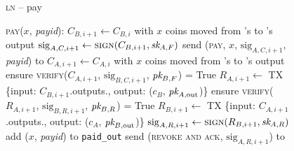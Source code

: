 \begin{figure}[H]
  \begin{processbox}{\textsc{ln} -- pay}
    \begin{algorithmic}[1]
      \State \textsc{pay}($x$, \textit{payid}): 
      \Indent
        \State $C_{B, i+1} \gets C_{B, i}$ with $x$ coins moved from \alice's to
        \bob's output
        \State $\mathrm{sig}_{A, C, i+1} \gets \textsc{sign}(C_{B, i+1}, \textit{sk}_{A,
        F})$ 
        \State send (\textsc{pay}, $x$, $\mathrm{sig}_{A, C, i+1}$,
        \textit{payid}) to \bob
        \State {}
        \State {}
        \State {}
        \State {} 
        \State {}
        \State {}
        \State {}
        \State $C_{A, i+1} \gets C_{A, i}$ with $x$ coins moved from \alice's to
        \bob's output
        \State ensure \textsc{verify}($C_{A, i+1}$, $\mathrm{sig}_{B, C, i+1}$,
        $\textit{pk}_{B, F}$) = True
        \State $R_{A, i+1} \gets$ TX \{input: $C_{B, i+1}$.outputs.\alice,
        output: ($c_B$, $\textit{pk}_{A, \mathrm{out}}$)\}
        \State ensure \textsc{verify}($R_{A, i+1}$, $\mathrm{sig}_{B, R, i+1}$,
        $\textit{pk}_{B, R}$) = True
        \State $R_{B, i+1} \gets$ TX \{input: $C_{A, i+1}$.outputs.\bob,
        output: ($c_A$, $\textit{pk}_{B, \mathrm{out}}$)\}
        \State $\mathrm{sig}_{A, R, i+1} \gets \textsc{sign}(R_{B, i+1}, \textit{sk}_{A,
        R})$
        \State add ($x$, \textit{payid}) to \texttt{paid\_out}
        \State send (\textsc{revoke and ack}, $\mathrm{sig}_{A, R, i+1}$) to
        \bob
        \State {}
        \State {}
        \State {}
      \EndIndent
    \end{algorithmic}
  \end{processbox}
  \caption{}
  \label{code:ln:pay}
\end{figure}

